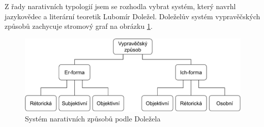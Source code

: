 Z řady narativních typologií jsem se rozhodla vybrat systém, který navrhl jazykovědec a literární teoretik Lubomír Doležel. Doleželův systém vypravěčských způsobů zachycuje stromový graf na obrázku \ref{fig:schema-dolezel}.\cite{dolezel-narativni-zpusoby}

\begin{figure}[ht]
\includegraphics[width=1\textwidth]{data/dolezel-schema.pdf}
\caption{Systém narativních způsobů podle Doležela}
\label{fig:schema-dolezel}
\end{figure}




